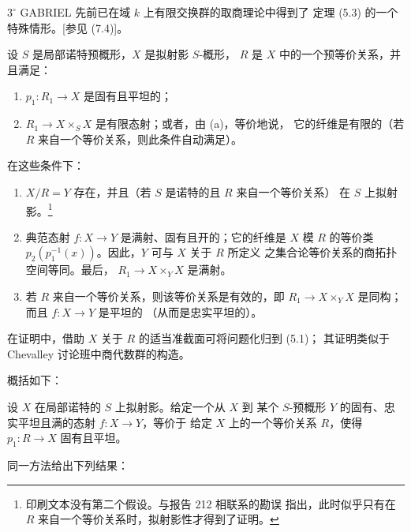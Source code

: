 \smallskip
\noindent $3^\circ$ GABRIEL 先前已在域 $k$ 上有限交换群的取商理论中得到了
定理 (5.3) 的一个特殊情形。[参见 (7.4)]。


 设 $S$ 是局部诺特预概形，$X$ 是拟射影 $S$-概形，
$R$ 是 $X$ 中的一个预等价关系，并且满足：
\begin{enumerate}
\item[(a)] $p_1:R_1\to X$ 是固有且平坦的；
\item[(b)] $R_1\to X\times_S X$ 是有限态射；或者，由 (a)，等价地说，
它的纤维是有限的（若 $R$ 来自一个等价关系，则此条件自动满足）。
\end{enumerate}
在这些条件下：
\begin{enumerate}
\item[(i)] $X/R=Y$ 存在，并且（若 $S$ 是诺特的且 $R$ 来自一个等价关系）
在 $S$ 上拟射影。\footnote{印刷文本没有第二个假设。与报告 212 相联系的勘误
指出，此时似乎只有在 $R$ 来自一个等价关系时，拟射影性才得到了证明。}

\item[(ii)] 典范态射 $f:X\to Y$ 是满射、固有且开的；它的纤维是 $X$
模 $R$ 的等价类 $p_2(p_1^{-1}(x))$。因此，$Y$ 可与 $X$ 关于 $R$ 所定义
之集合论等价关系的商拓扑空间等同。最后，
$R_1\to X\times_Y X$ 是满射。

\item[(iii)] 若 $R$ 来自一个等价关系，则该等价关系是有效的，即
$R_1\to X\times_Y X$ 是同构；而且 $f:X\to Y$ 是平坦的
（从而是忠实平坦的）。
\end{enumerate}

在证明中，借助 $X$ 关于 $R$ 的适当准截面可将问题化归到 (5.1)；
其证明类似于 Chevalley 讨论班中商代数群的构造。

概括如下：

 设 $X$ 在局部诺特的 $S$ 上拟射影。给定一个从 $X$ 到
某个 $S$-预概形 $Y$ 的固有、忠实平坦且满的态射 $f:X\to Y$，等价于
给定 $X$ 上的一个等价关系 $R$，使得 $p_1:R\to X$ 固有且平坦。

同一方法给出下列结果：

